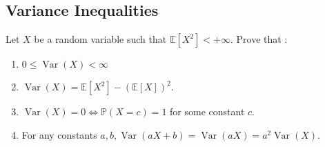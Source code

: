 \begin{center}
  \section*{Variance Inequalities}
\end{center}

\begin{Exercise}
  Let $X$ be a random variable such that $\mathbb{E}\left[X^2\right]<+\infty$. Prove that :
  \begin{enumerate}
    \item $0 \leq \operatorname{Var}(X)<\infty$
    \item $\operatorname{Var}(X)=\mathbb{E}\left[X^2\right]-(\mathbb{E}[X])^2$.
    \item $\operatorname{Var}(X)=0 \Longleftrightarrow \mathbb{P}(X=c)=1$ for some constant $c$.
    \item For any constants $a, b, \operatorname{Var}(a X+b)=\operatorname{Var}(a X)=a^2 \operatorname{Var}(X)$.
  \end{enumerate}
\end{Exercise}

